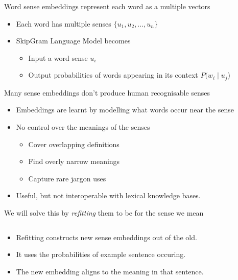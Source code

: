 \documentclass[dvipsnames]{beamer}
\newcommand{\fitcolumn}[1]{
	\begin{column}{0.5\textwidth}
		\begin{adjustbox}{max width=\columnwidth}
			#1
		\end{adjustbox}
	\end{column}%
}
\newcommand{\inputcolumn}[1]{%
	\fitcolumn{}
}
\begin{document}
\begin{frame}{Word sense embeddings represent each word as a multiple vectors}
	\begin{itemize}
		\item Each word has multiple senses $\{u_1, u_2, ..., u_n\}$
		\item SkipGram Language Model becomes \begin{itemize}
			\item \alert{Input} a word sense $u_i$
			\item \alert{Output} probabilities of words appearing in its context \alert{$P(w_i \mid u_j$)}
		\end{itemize}
	\end{itemize}
	\sentexample
\end{frame}

\begin{frame}{Many sense embeddings don't produce human recognisable senses}
	 \begin{itemize}
	 	\item<1-> Embeddings are learnt by modelling what words occur near the sense
	 	\item<2-> No control over the meanings of the senses \begin{itemize}
	 		\item Cover overlapping definitions
	 		\item Find overly narrow meanings
	 		\item Capture rare jargon uses
	 	\end{itemize}
		\item<3-> Useful, but not interoperable with lexical knowledge bases.	
	 \end{itemize}
\end{frame}



\begin{frame}[label=refittingslide]{We will solve this by \emph{refitting} them to be for the sense we mean}
	\begin{columns}[T]
		\begin{column}{0.5\textwidth}
			\begin{itemize}
				\item \alert{Refitting} constructs new sense embeddings out of the old.
				
				\item It uses the \alert{probabilities} of example sentence occuring.
				
				\item The new embedding aligns to the meaning in \alert{that sentence}.
			\end{itemize}			
		\end{column}
		
		\inputcolumn{../figs/refitting.tex}
		
	\end{columns}
\end{frame}
\end{document}
